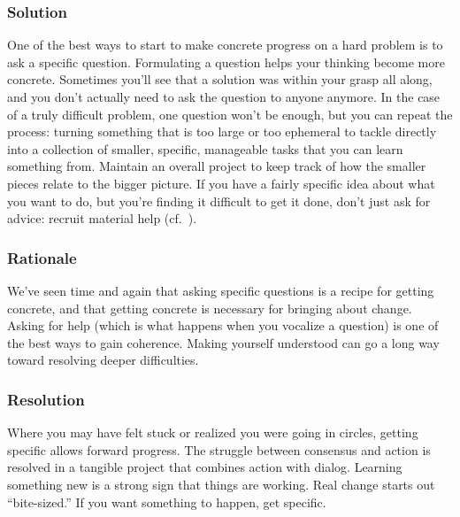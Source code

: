 \subsubsection*{Solution} 
One of the best ways to start to make concrete progress on a hard problem is to ask a specific question.   Formulating a question helps your thinking become more concrete.  Sometimes you'll see that a solution was within your grasp all along, and you don't actually need to ask the question to anyone anymore.  In the case of a truly difficult problem, one question won't be enough, but you can repeat the process: turning something that is too large or too ephemeral to tackle directly into a collection of smaller, specific, manageable tasks that you can learn something from. Maintain an overall project  to keep track of how the smaller pieces relate to the bigger picture.  If you have a fairly specific idea about what you want to do, but you're finding it difficult to get it done, don't just ask for advice: recruit material help (cf.~).

\subsubsection*{Rationale} 
We've seen time and again that asking specific questions is a recipe
for getting concrete, and that getting concrete is necessary for
bringing about change.  Asking for help (which is what happens
when you vocalize a question) is one of the best ways to
gain coherence.  Making yourself understood can go a long way
toward resolving deeper difficulties.

\subsubsection*{Resolution}
Where you may have felt stuck or realized you were going in circles, getting specific allows forward progress.  The struggle between consensus and action is resolved in a tangible project that combines action with dialog.  Learning something new is a strong sign that things are working.
%
Real change starts out ``bite-sized.'' If you want something to happen, get specific.

